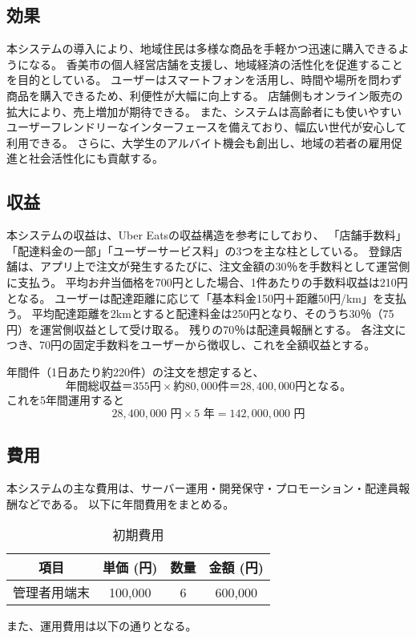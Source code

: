\subsection{効果}
本システムの導入により、地域住民は多様な商品を手軽かつ迅速に購入できるようになる。
香美市の個人経営店舗を支援し、地域経済の活性化を促進することを目的としている。
ユーザーはスマートフォンを活用し、時間や場所を問わず商品を購入できるため、利便性が大幅に向上する。
店舗側もオンライン販売の拡大により、売上増加が期待できる。
また、システムは高齢者にも使いやすいユーザーフレンドリーなインターフェースを備えており、幅広い世代が安心して利用できる。
さらに、大学生のアルバイト機会も創出し、地域の若者の雇用促進と社会活性化にも貢献する。



\subsection{収益}
本システムの収益は、Uber Eatsの収益構造を参考にしており、
「店舗手数料」「配達料金の一部」「ユーザーサービス料」の3つを主な柱としている。
登録店舗は、アプリ上で注文が発生するたびに、注文金額の30％を手数料として運営側に支払う。
平均お弁当価格を700円とした場合、1件あたりの手数料収益は210円となる。
ユーザーは配達距離に応じて「基本料金150円＋距離50円/km」を支払う。
平均配達距離を2kmとすると配達料金は250円となり、そのうち30％（75円）を運営側収益として受け取る。
残りの70％は配達員報酬とする。
各注文につき、70円の固定手数料をユーザーから徴収し、これを全額収益とする。

年間件（1日あたり約220件）の注文を想定すると、
\[
年間総収益＝355円 \times 約80,000件 ＝ 28,400,000円 となる。
\]
これを5年間運用すると
 \[
 28,400,000\text{ 円} \times 5\text{ 年} = 142,000,000\text{ 円}
 \]

\subsection{費用}
本システムの主な費用は、サーバー運用・開発保守・プロモーション・配達員報酬などである。
以下に年間費用をまとめる。
\begin{table}[H]
\centering
\caption{初期費用}
\begin{tabular}{|c|c|c|c|}
\hline
項目 & 単価 (円) & 数量 & 金額 (円) \\
\hline
管理者用端末 & 100,000 & 6 & 600,000 \\
\hline
\end{tabular}
\end{table}

また、運用費用は以下の通りとなる。

